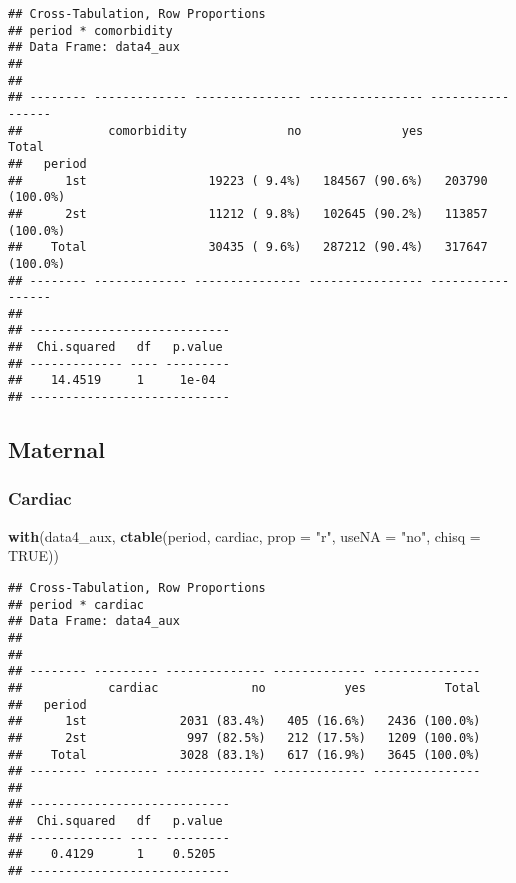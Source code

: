 \documentclass[
]{article}
\newenvironment{Shaded}{\begin{snugshade}}{\end{snugshade}}
\newcommand{\DataTypeTok}[1]{\textcolor[rgb]{0.13,0.29,0.53}{#1}}
\newcommand{\KeywordTok}[1]{\textcolor[rgb]{0.13,0.29,0.53}{\textbf{#1}}}
\newcommand{\NormalTok}[1]{#1}
\newcommand{\OperatorTok}[1]{\textcolor[rgb]{0.81,0.36,0.00}{\textbf{#1}}}
\newcommand{\OtherTok}[1]{\textcolor[rgb]{0.56,0.35,0.01}{#1}}
\newcommand{\StringTok}[1]{\textcolor[rgb]{0.31,0.60,0.02}{#1}}
\begin{document}
\begin{verbatim}
## Cross-Tabulation, Row Proportions  
## period * comorbidity  
## Data Frame: data4_aux  
## 
## 
## -------- ------------- --------------- ---------------- -----------------
##            comorbidity              no              yes             Total
##   period                                                                 
##      1st                 19223 ( 9.4%)   184567 (90.6%)   203790 (100.0%)
##      2st                 11212 ( 9.8%)   102645 (90.2%)   113857 (100.0%)
##    Total                 30435 ( 9.6%)   287212 (90.4%)   317647 (100.0%)
## -------- ------------- --------------- ---------------- -----------------
## 
## ----------------------------
##  Chi.squared   df   p.value 
## ------------- ---- ---------
##    14.4519     1     1e-04  
## ----------------------------
\end{verbatim}

\hypertarget{maternal-1}{%
\subsection{Maternal}\label{maternal-1}}

\begin{Shaded}
\end{Shaded}

\hypertarget{cardiac-2}{%
\subsubsection{Cardiac}\label{cardiac-2}}

\begin{Shaded}
\begin{Highlighting}[]
\KeywordTok{with}\NormalTok{(data4_aux, }\KeywordTok{ctable}\NormalTok{(period, cardiac, }\DataTypeTok{prop =} \StringTok{"r"}\NormalTok{, }\DataTypeTok{useNA =} \StringTok{"no"}\NormalTok{, }\DataTypeTok{chisq =} \OtherTok{TRUE}\NormalTok{))}
\end{Highlighting}
\end{Shaded}

\begin{verbatim}
## Cross-Tabulation, Row Proportions  
## period * cardiac  
## Data Frame: data4_aux  
## 
## 
## -------- --------- -------------- ------------- ---------------
##            cardiac             no           yes           Total
##   period                                                       
##      1st             2031 (83.4%)   405 (16.6%)   2436 (100.0%)
##      2st              997 (82.5%)   212 (17.5%)   1209 (100.0%)
##    Total             3028 (83.1%)   617 (16.9%)   3645 (100.0%)
## -------- --------- -------------- ------------- ---------------
## 
## ----------------------------
##  Chi.squared   df   p.value 
## ------------- ---- ---------
##    0.4129      1    0.5205  
## ----------------------------
\end{verbatim}
\end{document}
